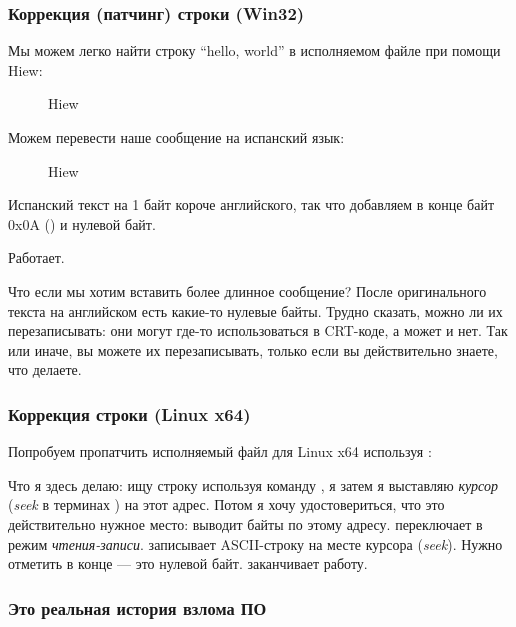 \subsubsection{Коррекция (патчинг) строки (Win32)}

Мы можем легко найти строку ``hello, world'' в исполняемом файле при помощи Hiew:

\begin{figure}[H]
\centering
{}
\caption{Hiew}
\label{}
\end{figure}

Можем перевести наше сообщение на испанский язык:

\begin{figure}[H]
\centering
{}
\caption{Hiew}
\label{}
\end{figure}

Испанский текст на 1 байт короче английского, так что добавляем в конце байт 0x0A () и нулевой байт.

Работает.

Что если мы хотим вставить более длинное сообщение?
После оригинального текста на английском есть какие-то нулевые байты.
Трудно сказать, можно ли их перезаписывать: они могут где-то использоваться в \ac{CRT}-коде, а может и нет.
Так или иначе, вы можете их перезаписывать, только если вы действительно знаете, что делаете.

\subsubsection{Коррекция строки (Linux x64)}

\myindex{\radare}
Попробуем пропатчить исполняемый файл для Linux x64 используя \radare{}:



Что я здесь делаю: ищу строку  используя команду \TT{/}, 
я затем я выставляю \emph{курсор} (\emph{seek} в терминах \radare{}) на этот адрес.
Потом я хочу удостовериться, что это действительно нужное место:  выводит байты по этому адресу.
 переключает \radare{} в режим \emph{чтения-записи}.
 записывает ASCII-строку на месте курсора (\emph{seek}).
Нужно отметить  в конце --- это нулевой байт.
 заканчивает работу.

\subsubsection{Это реальная история взлома ПО}
\label{\SoftwareCracking}

